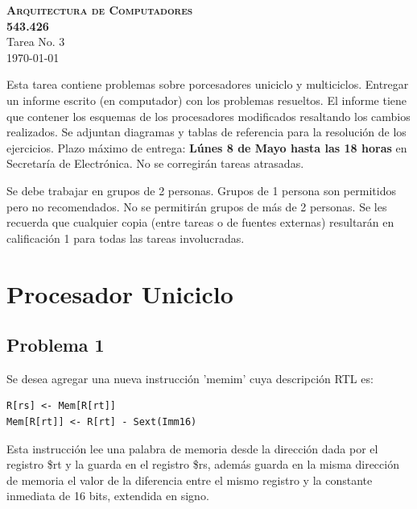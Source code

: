 \documentclass[letterpaper,11pt,notitlepage]{article}
\begin{document}

\begin{center}
\textsc{ \huge \bfseries Arquitectura de Computadores\\[0.2cm] 543.426}\\[0.2cm]
Tarea No. 3\\

\today

\end{center}



Esta tarea contiene problemas sobre porcesadores uniciclo y multiciclos. Entregar un informe escrito (en computador) con los problemas resueltos. El informe tiene que contener los esquemas de los procesadores modificados resaltando los cambios realizados. Se adjuntan diagramas y tablas de referencia para la resolución de los ejercicios. Plazo máximo de entrega: \textbf{Lúnes 8 de Mayo hasta las 18 horas} en Secretaría de Electrónica. No se corregirán tareas atrasadas.

Se debe trabajar en grupos de 2 personas. Grupos de 1 persona son permitidos pero no recomendados. No se permitirán grupos de más de 2 personas. Se les recuerda que cualquier copia (entre tareas o de fuentes externas) resultarán en calificación 1 para todas las tareas involucradas.

\section*{Procesador Uniciclo}

\subsection*{Problema 1}

Se desea agregar una nueva instrucción 'memim' cuya descripción RTL es:

\begin{lstlisting}[style=C]
R[rs] <- Mem[R[rt]]
Mem[R[rt]] <- R[rt] - Sext(Imm16)
\end{lstlisting}

Esta instrucción lee una palabra de memoria desde la dirección dada por el registro \$rt y la guarda en el registro \$rs, además guarda en la misma dirección de memoria el valor de la diferencia entre el mismo registro y la constante inmediata de 16 bits, extendida en signo.
\end{document}
